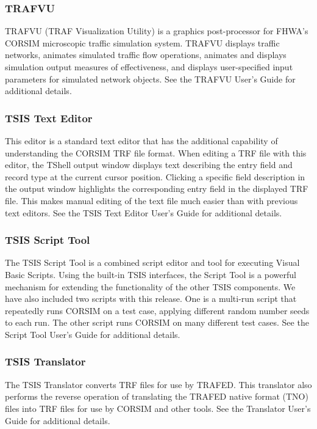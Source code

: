 \subsubsection{TRAFVU}

TRAFVU (TRAF Visualization Utility) is a graphics post-processor for FHWA’s CORSIM microscopic traffic
simulation system. TRAFVU displays traffic networks, animates simulated traffic flow operations, animates and displays simulation output measures of effectiveness, and displays user-specified input parameters for simulated
network objects. See the TRAFVU User's Guide for additional details.

\subsubsection{TSIS Text Editor}

This editor is a standard text editor that has the additional capability of understanding the CORSIM TRF file
format. When editing a TRF file with this editor, the TShell output window displays text describing the entry field
and record type at the current cursor position. Clicking a specific field description in the output window highlights
the corresponding entry field in the displayed TRF file. This makes manual editing of the text file much easier than
with previous text editors. See the TSIS Text Editor User's Guide for additional details.

\subsubsection{TSIS Script Tool}

The TSIS Script Tool is a combined script editor and tool for executing Visual Basic Scripts. Using the built-in
TSIS interfaces, the Script Tool is a powerful mechanism for extending the functionality of the other TSIS
components. We have also included two scripts with this release. One is a multi-run script that repeatedly runs
CORSIM on a test case, applying different random number seeds to each run. The other script runs CORSIM on
many different test cases. See the Script Tool User's Guide for additional details.

\subsubsection{TSIS Translator}

The TSIS Translator converts TRF files for use by TRAFED. This translator also performs the reverse operation of
translating the TRAFED native format (TNO) files into TRF files for use by CORSIM and other tools. See the
Translator User's Guide for additional details.

